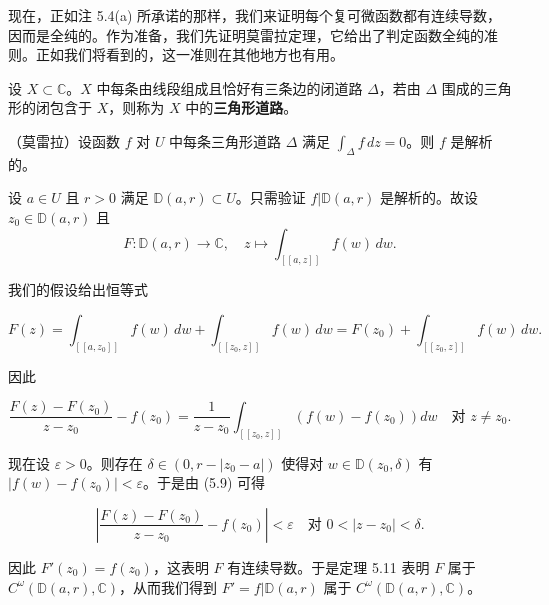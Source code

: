 现在，正如注 5.4(a) 所承诺的那样，我们来证明每个复可微函数都有连续导数，因而是全纯的。作为准备，我们先证明莫雷拉定理，它给出了判定函数全纯的准则。正如我们将看到的，这一准则在其他地方也有用。

设 $ X \subset \mathbb{C} $。$ X $ 中每条由线段组成且恰好有三条边的闭道路 $ \Delta $，若由 $ \Delta $ 围成的三角形的闭包含于 $ X $，则称为 $ X $ 中的\textbf{三角形道路}。

\begin{theorem}

（莫雷拉）设函数 $ f $ 对 $ U $ 中每条三角形道路 $ \Delta $ 满足 $ \int_{\Delta} f\,dz = 0 $。则 $ f $ 是解析的。

\proofhead
设 $ a \in U $ 且 $ r > 0 $ 满足 $ \mathbb{D}(a,r) \subset U $。只需验证 $ f|\mathbb{D}(a,r) $ 是解析的。故设 $ z_{0} \in \mathbb{D}(a,r) $ 且
\[
F : \mathbb{D}(a,r) \to \mathbb{C} , \quad z \mapsto \int_{[[a,z]]}f(w)\,dw .
\]

我们的假设给出恒等式

\[
F(z) = \int_{[[a,z_{0}]]}f(w)\,dw + \int_{[[z_{0},z]]}f(w)\,dw = F(z_{0}) + \int_{[[z_{0},z]]}f(w)\,dw .
\]

因此

\begin{equation}
\frac{F(z) - F(z_{0})}{z - z_{0}} - f(z_{0}) = \frac{1}{z - z_{0}}\int_{[[z_{0},z]]}\left(f(w) - f(z_{0})\right)dw \quad \text{对 } z \ne z_{0} .\tag{5.9}
\end{equation}

现在设 $ \varepsilon > 0 $。则存在 $ \delta \in (0, r - |z_{0} - a|) $ 使得对 $ w \in \mathbb{D}(z_{0},\delta) $ 有 $ |f(w) - f(z_{0})| < \varepsilon $。于是由 (5.9) 可得

\[
\left|\frac{F(z) - F(z_{0})}{z - z_{0}} - f(z_{0})\right| < \varepsilon \quad \text{对 } 0 < |z - z_{0}| < \delta .
\]

因此 $ F'(z_{0}) = f(z_{0}) $，这表明 $ F $ 有连续导数。于是定理 5.11 表明 $ F $ 属于 $ C^{\omega}\left(\mathbb{D}(a,r),\mathbb{C}\right) $，从而我们得到 $ F' = f|\mathbb{D}(a,r) $ 属于 $ C^{\omega}\left(\mathbb{D}(a,r),\mathbb{C}\right) $。

\end{theorem}

